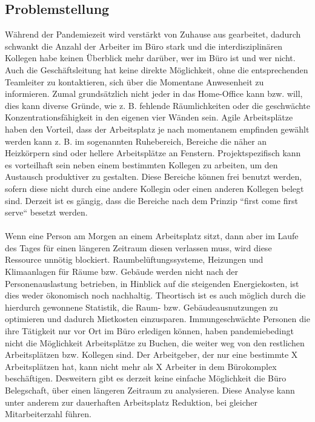 \documentclass[
    12pt,
    headings=big,
    version=first,
    ngerman,
    a4paper,
    BCOR=5mm,
    DIV=14,
    1headlines,
    pagesize,
    oneside,
    openright,
    titlepage,
    headsepline,
    chapterprefix=false,
    bibliography=totoc,
    toc=graduated,
    listof=graduated,
    numbers=noenddot,
    cleardoublepage=empty,
    fleqn,
    parskip=half,
]{scrbook}
\begin{document}
\subsection{Problemstellung}
Während der Pandemiezeit wird verstärkt von Zuhause aus gearbeitet, dadurch schwankt die Anzahl der Arbeiter im Büro
stark und die interdisziplinären Kollegen habe keinen Überblick mehr darüber, wer im Büro ist und wer nicht.
Auch die Geschäftsleitung hat keine direkte Möglichkeit, ohne die entsprechenden Teamleiter zu kontaktieren, sich über 
die Momentane Anwesenheit zu informieren.
Zumal grundsätzlich nicht jeder in das Home-Office kann bzw. will, dies kann diverse Gründe, wie z. B. fehlende
Räumlichkeiten oder die geschwächte Konzentrationsfähigkeit in den eigenen vier Wänden sein. Agile Arbeitsplätze
haben den Vorteil, dass der Arbeitsplatz je nach momentanem empfinden gewählt werden kann z. B. im sogenannten Ruhebereich,
Bereiche die näher an Heizkörpern sind oder hellere Arbeitsplätze an Fenstern. Projektspezifisch kann es vorteilhaft sein
neben einem bestimmten Kollegen zu arbeiten, um den Austausch produktiver zu gestalten. Diese Bereiche können frei benutzt werden,
sofern diese nicht durch eine andere Kollegin oder einen anderen Kollegen belegt sind. Derzeit ist es gängig, dass die Bereiche nach
dem Prinzip “first come first serve“ besetzt werden.\\\\
Wenn eine Person am Morgen an einem Arbeitsplatz sitzt, dann aber im Laufe des Tages für einen längeren Zeitraum diesen verlassen muss,
wird diese Ressource unnötig blockiert. Raumbelüftungssysteme, Heizungen und Klimaanlagen für Räume bzw. Gebäude werden nicht
nach der Personenauslastung betrieben, in Hinblick auf die steigenden Energiekosten, ist dies weder ökonomisch noch nachhaltig.
Theortisch ist es auch möglich durch die hierdurch gewonnene Statistik, die Raum- bzw. Gebäudeausnutzungen zu optimieren
und dadurch Mietkosten einzusparen.
Immungeschwächte Personen die ihre Tätigkeit nur vor Ort im Büro erledigen können, haben pandemiebedingt nicht die Möglichkeit
Arbeitsplätze zu Buchen, die weiter weg von den restlichen Arbeitsplätzen bzw. Kollegen sind. Der Arbeitgeber, der nur eine bestimmte
X Arbeitsplätzen hat, kann nicht mehr als X Arbeiter in dem Bürokomplex beschäftigen. Desweitern gibt es derzeit keine einfache Möglichkeit
die Büro Belegschaft, über einen längeren Zeitraum zu analysieren. Diese Analyse kann unter anderem zur dauerhaften Arbeitsplatz Reduktion,
bei gleicher Mitarbeiterzahl führen.\\\\
\end{document}
